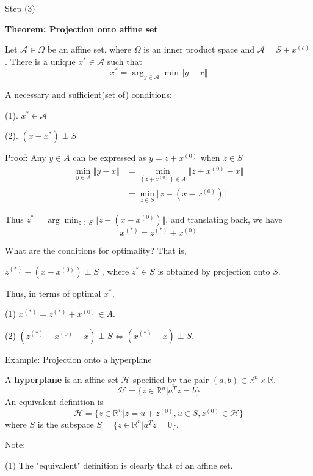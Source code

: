 \begin{marginfigure}
	\centering
	\resizebox{7.5cm}{3cm}{}
	\caption{Step (3)}
	\label{}
\end{marginfigure}

\vspace{0.3cm}
\textbf{Theorem: Projection onto affine set}

Let $\mathcal{A}\in \Omega$ be an affine set, where $\Omega$ is an inner product space and $\mathcal{A}=S+x^{(c)}$. There is a unique $x^{*}\in \mathcal{A}$ such that 
$$x^{*} = \arg_{y\in \mathcal{A}}\min \Vert y-x\Vert$$

A necessary and sufficient(set of) conditions:

(1). $x^{*} \in \mathcal{A}$

(2). $(x-x^{*})\perp S$

\vspace{0.3cm}
Proof: Any $y\in A$ can be expressed as $y=z+x^{(0)}$ when $z\in S$
\begin{align*}
\min_{y\in A} \Vert y-x\Vert&=\min_{(z+x^{(0)})\in A} \Vert z+x^{(0)}-x\Vert\\
&=\min_{z\in S} \Vert z-(x-x^{(0)})\Vert
\end{align*}

Thus $z^{*}=\arg\min_{z\in S} \Vert z-(x-x^{(0)})\Vert$, and translating back, we have
$$x^{(*)}=z^{(*)}+x^{(0)}$$


What are the conditions for optimality? That is,

$z^{(*)}-(x-x^{(0)})\perp S$ , where $z^{*}\in S$ is obtained by projection onto $S$.

Thus, in terms of optimal $x^{*}$,

(1) $x^{(*)}=z^{(*)}+x^{(0)} \in A$.

(2) $(z^{(*)}+x^{(0)}-x) \perp S \Leftrightarrow (x^{(*)}-x)\perp S$.


\vspace{0.3cm}
Example: Projection onto a hyperplane

A \textbf{hyperplane} is an affine set $\mathcal{H}$ specified by the pair $(a, b) \in \mathbb{R}^n \times \mathbb{R}$. 
\[
\mathcal{H} = \{ z \in \mathbb{R}^n | a^{T} z = b \}
\] 
An equivalent definition is 
\[
\mathcal{H} = \{ z \in \mathbb{R}^n | z = u + z^{(0)}, u \in S, z^{(0)} \in \mathcal{H} \}
\] 
where $S$ is the subspace $S = \{ z \in \mathbb{R}^n | a^{T} z = 0 \}$. 

Note: 

(1) The "equivalent" definition is clearly that of an affine set.

